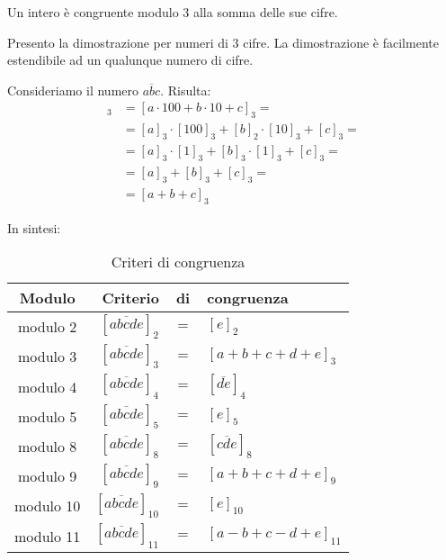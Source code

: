 \begin{teorema}
    Un intero è congruente modulo 3 alla somma delle sue cifre.

    Presento la dimostrazione per numeri di 3 cifre.
    La dimostrazione è facilmente estendibile ad un qualunque numero di cifre.

    Consideriamo il numero $\overline{abc}$.
    Risulta:
    \begin{align*}
        [\overline{abc}]_3 &= [a \cdot 100 + b \cdot 10 + c]_3 = \\
        &= [a]_3 \cdot [100]_3 + [b]_2 \cdot [10]_3 + [c]_3 = \\
        &= [a]_3 \cdot [1]_3 + [b]_3 \cdot [1]_3 + [c]_3 = \\
        &= [a]_3 + [b]_3 + [c]_3 = \\
        &= [a + b + c]_3
    \end{align*}
\end{teorema}

In sintesi:

\begin{table}[H]
    \begin{mdframed}    
        \label{tab:criteri_congruenza}
        \centering
        \begin{tabular}{c|rcl}
            \toprule
            Modulo & Criterio & di & congruenza \\
            \midrule
            modulo 2 & $[\overline{abcde}]_2 $ & $ = $ & $ [e]_2$ \\
            modulo 3 & $[\overline{abcde}]_3 $ & $ = $ & $ [a + b + c + d + e]_3$ \\
            modulo 4 & $[\overline{abcde}]_4 $ & $ = $ & $ [\overline{de}]_4$ \\
            modulo 5 & $[\overline{abcde}]_5 $ & $ = $ & $ [e]_5$ \\
            modulo 8 & $[\overline{abcde}]_8 $ & $ = $ & $ [\overline{cde}]_8$ \\
            modulo 9 & $[\overline{abcde}]_9 $ & $ = $ & $ [a + b + c + d + e]_9$ \\
            modulo 10 & $[\overline{abcde}]_{10} $ & $ = $ & $ [e]_{10}$ \\
            modulo 11 & $[\overline{abcde}]_{11} $ & $ = $ & $ [a - b + c - d + e]_{11}$ \\
            \bottomrule
        \end{tabular}
        \caption{Criteri di congruenza}
    \end{mdframed}
\end{table}

